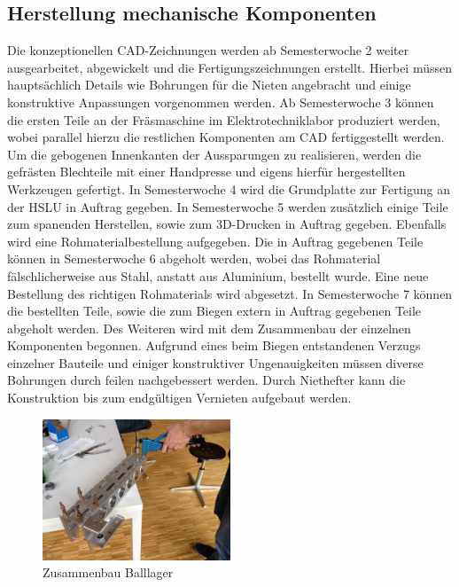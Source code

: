 \subsection{Herstellung mechanische Komponenten}
Die konzeptionellen CAD-Zeichnungen werden ab Semesterwoche 2 weiter 
ausgearbeitet, abgewickelt und die Fertigungszeichnungen erstellt. Hierbei 
müssen hauptsächlich Details wie Bohrungen für die Nieten angebracht und 
einige konstruktive Anpassungen vorgenommen werden. 
Ab Semesterwoche 3 können die ersten Teile an der Fräsmaschine im 
Elektrotechniklabor produziert werden, wobei parallel  hierzu die restlichen 
Komponenten am CAD fertiggestellt werden.  Um die gebogenen Innenkanten der 
Aussparungen zu realisieren, werden die gefrästen Blechteile mit einer 
Handpresse und eigens hierfür hergestellten Werkzeugen gefertigt.
In Semesterwoche 4 wird die Grundplatte zur Fertigung an der HSLU in Auftrag 
gegeben.
In Semesterwoche 5 werden zusätzlich einige Teile zum spanenden Herstellen, 
sowie zum 3D-Drucken in Auftrag gegeben. Ebenfalls wird eine 
Rohmaterialbestellung aufgegeben.
Die in Auftrag gegebenen Teile können in Semesterwoche 6 abgeholt werden, 
wobei das  Rohmaterial fälschlicherweise aus Stahl, anstatt aus Aluminium, 
bestellt wurde. Eine neue Bestellung des richtigen Rohmaterials wird abgesetzt.
In Semesterwoche 7 können die bestellten Teile, sowie die zum Biegen extern in 
Auftrag gegebenen Teile abgeholt werden. Des Weiteren wird mit dem Zusammenbau 
der einzelnen Komponenten begonnen. Aufgrund eines beim Biegen entstandenen 
Verzugs einzelner Bauteile und einiger konstruktiver Ungenauigkeiten müssen 
diverse Bohrungen durch feilen nachgebessert werden. Durch Niethefter kann die 
Konstruktion bis zum endgültigen Vernieten aufgebaut werden.

\begin{figure}[h!]
	\centering
	\includegraphics[width=0.5\textwidth]{fig/IMG_2290.JPG}
	\caption{Zusammenbau Balllager}
	\label{fig:Zusammenbau Balllager}
\end{figure}

